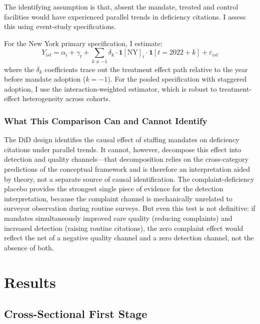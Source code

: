 \documentclass[12pt]{article}
\begin{document}
The identifying assumption is that, absent the mandate, treated and control facilities would have experienced parallel trends in deficiency citations. I assess this using event-study specifications.

For the New York primary specification, I estimate:
\begin{equation}
Y_{ist} = \alpha_i + \gamma_t + \sum_{k \neq -1} \delta_k \cdot \mathbf{1}[\text{NY}]_i \cdot \mathbf{1}[t = \text{2022} + k] + \varepsilon_{ist}
\label{eq:eventstudy}
\end{equation}
where the $\delta_k$ coefficients trace out the treatment effect path relative to the year before mandate adoption ($k = -1$). For the pooled specification with staggered adoption, I use the \citet{sun2021} interaction-weighted estimator, which is robust to treatment-effect heterogeneity across cohorts.

\subsubsection{What This Comparison Can and Cannot Identify} The DiD design identifies the causal effect of staffing mandates on deficiency citations under parallel trends. It cannot, however, decompose this effect into detection and quality channels---that decomposition relies on the cross-category predictions of the conceptual framework and is therefore an interpretation aided by theory, not a separate source of causal identification. The complaint-deficiency placebo provides the strongest single piece of evidence for the detection interpretation, because the complaint channel is mechanically unrelated to surveyor observation during routine surveys. But even this test is not definitive: if mandates simultaneously improved care quality (reducing complaints) and increased detection (raising routine citations), the zero complaint effect would reflect the net of a negative quality channel and a zero detection channel, not the absence of both.


\section{Results}
\label{sec:results}

\subsection{Cross-Sectional First Stage}
\end{document}
